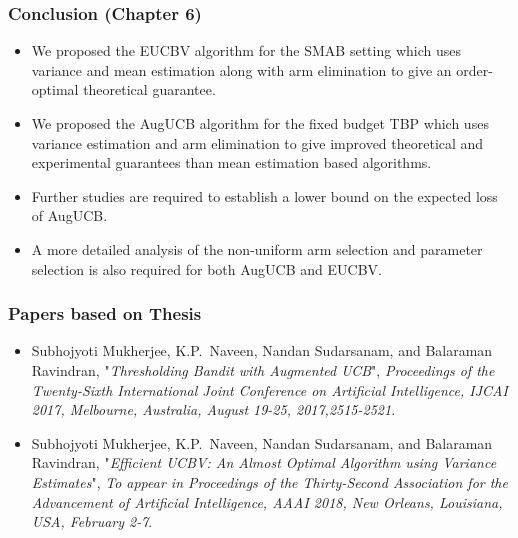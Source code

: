 \begin{frame}
\frametitle{Conclusion ({Chapter 6})}
\begin{itemize}
\item<1-> We proposed the EUCBV algorithm for the SMAB setting which uses variance and mean estimation along with arm elimination to give an order-optimal theoretical guarantee.
\item<2-> We proposed the AugUCB algorithm for the fixed budget TBP  which uses variance estimation and arm elimination to give improved theoretical and experimental guarantees than mean estimation based algorithms.
\item<3-> Further studies are required to establish a lower bound on the expected loss of AugUCB.
\item<4-> A more detailed analysis of the non-uniform arm selection and parameter selection is also required for both AugUCB and EUCBV.
\end{itemize}
\end{frame}

\begin{frame}
\frametitle{Papers based on Thesis}
\begin{itemize}
\item Subhojyoti Mukherjee, K.P.~Naveen, Nandan Sudarsanam, and Balaraman Ravindran, "\textit{Thresholding Bandit with Augmented UCB}", {\em Proceedings of the Twenty-Sixth International Joint Conference on
               Artificial Intelligence, {IJCAI} 2017, Melbourne, Australia, August
               19-25, 2017,2515-2521}.
\item Subhojyoti Mukherjee, K.P.~Naveen, Nandan Sudarsanam, and Balaraman Ravindran, "\textit{Efficient UCBV: An Almost Optimal Algorithm using Variance Estimates}", {\em To appear in Proceedings of the Thirty-Second Association for the Advancement of Artificial Intelligence, {AAAI} 2018, New Orleans, Louisiana, USA, February 2-7}.
\end{itemize}
\end{frame}